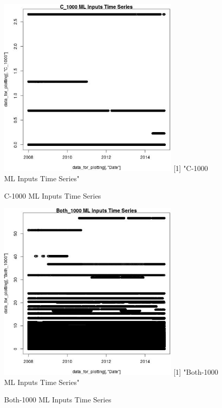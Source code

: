 \begin{figure} 
\centering  
\includegraphics[width=0.77\textwidth]{Code_Outputs/ML_input_report_ML_input_PM25_Step5_part_d_de_duplicated_aves_ML_input_C_1000TS.jpg} 
[1] "C-1000 ML Inputs Time Series"
\caption{\label{fig:ML_input_report_ML_input_PM25_Step5_part_d_de_duplicated_aves_ML_inputC_1000TS}C-1000 ML Inputs Time Series} 
\end{figure} 
 

\begin{figure} 
\centering  
\includegraphics[width=0.77\textwidth]{Code_Outputs/ML_input_report_ML_input_PM25_Step5_part_d_de_duplicated_aves_ML_input_Both_1000TS.jpg} 
[1] "Both-1000 ML Inputs Time Series"
\caption{\label{fig:ML_input_report_ML_input_PM25_Step5_part_d_de_duplicated_aves_ML_inputBoth_1000TS}Both-1000 ML Inputs Time Series} 
\end{figure} 
 

